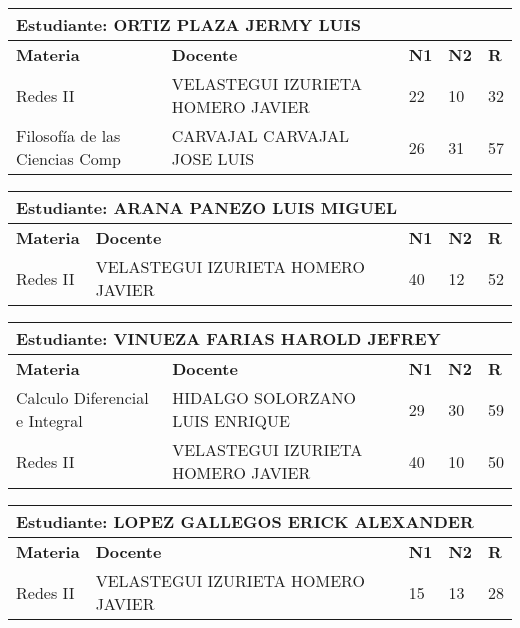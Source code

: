 \small
\begin{tabularx}{\textwidth}{|p{5cm}|p{7cm}|X|X|X|}
\hline
\multicolumn{5}{|p{\dimexpr\textwidth-2\tabcolsep-2\arrayrulewidth}|}{\textbf{Estudiante: ORTIZ PLAZA JERMY LUIS }}\\\hline
\textbf{Materia} & \textbf{Docente} & \textbf{N1} & \textbf{N2} & \textbf{R} \\ \hline
Redes II & VELASTEGUI IZURIETA HOMERO JAVIER  & 22 & 10& 32 \\ \hline
Filosofía de las Ciencias Comp & CARVAJAL CARVAJAL JOSE LUIS  & 26 & 31& 57 \\ \hline
\end{tabularx}\vspace{10mm}
\small
\begin{tabularx}{\textwidth}{|p{5cm}|p{7cm}|X|X|X|}
\hline
\multicolumn{5}{|p{\dimexpr\textwidth-2\tabcolsep-2\arrayrulewidth}|}{\textbf{Estudiante: ARANA PANEZO LUIS MIGUEL }}\\\hline
\textbf{Materia} & \textbf{Docente} & \textbf{N1} & \textbf{N2} & \textbf{R} \\ \hline
Redes II & VELASTEGUI IZURIETA HOMERO JAVIER  & 40 & 12& 52 \\ \hline
\end{tabularx}\vspace{10mm}
\small
\begin{tabularx}{\textwidth}{|p{5cm}|p{7cm}|X|X|X|}
\hline
\multicolumn{5}{|p{\dimexpr\textwidth-2\tabcolsep-2\arrayrulewidth}|}{\textbf{Estudiante: VINUEZA FARIAS HAROLD JEFREY }}\\\hline
\textbf{Materia} & \textbf{Docente} & \textbf{N1} & \textbf{N2} & \textbf{R} \\ \hline
Calculo Diferencial e Integral & HIDALGO SOLORZANO LUIS ENRIQUE  & 29 & 30& 59 \\ \hline
Redes II & VELASTEGUI IZURIETA HOMERO JAVIER  & 40 & 10& 50 \\ \hline
\end{tabularx}\vspace{10mm}
\small
\begin{tabularx}{\textwidth}{|p{5cm}|p{7cm}|X|X|X|}
\hline
\multicolumn{5}{|p{\dimexpr\textwidth-2\tabcolsep-2\arrayrulewidth}|}{\textbf{Estudiante: LOPEZ GALLEGOS ERICK ALEXANDER }}\\\hline
\textbf{Materia} & \textbf{Docente} & \textbf{N1} & \textbf{N2} & \textbf{R} \\ \hline
Redes II & VELASTEGUI IZURIETA HOMERO JAVIER  & 15 & 13& 28 \\ \hline
\end{tabularx}\vspace{10mm}
